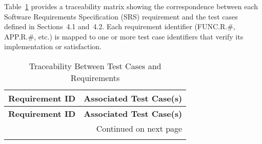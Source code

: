 \documentclass[12pt, titlepage]{article}
\begin{document}
Table~\ref{tab:traceability} provides a traceability matrix showing the correspondence between each Software Requirements Specification (SRS) requirement and the test cases defined in Sections~4.1 and~4.2. Each requirement identifier (FUNC.R.\#, APP.R.\#, etc.) is mapped to one or more test case identifiers that verify its implementation or satisfaction.

\renewcommand{\arraystretch}{1.2}
\begin{longtable}{|l|p{10cm}|}
\caption{Traceability Between Test Cases and Requirements}
\label{tab:traceability} \\
\hline
\textbf{Requirement ID} & \textbf{Associated Test Case(s)} \\
\hline
\endfirsthead
\hline
\textbf{Requirement ID} & \textbf{Associated Test Case(s)} \\
\hline
\endhead
\hline \multicolumn{2}{r}{{Continued on next page}} \\
\endfoot
\hline
\endlastfoot


\end{longtable}
\end{document}
